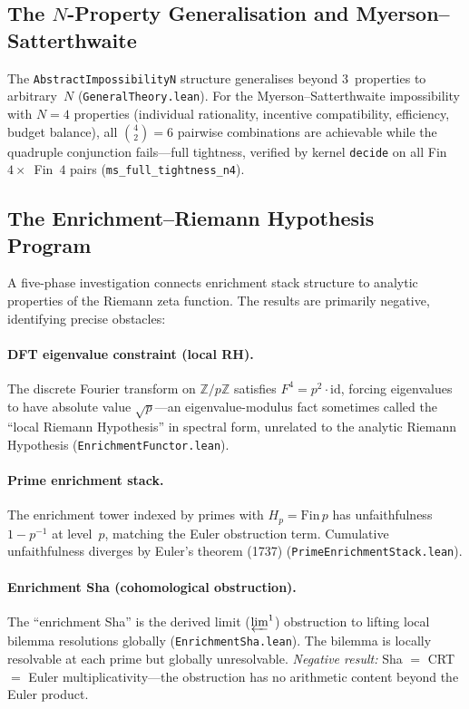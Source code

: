 \documentclass[11pt,a4paper]{article}
\begin{document}
\subsection{The $N$-Property Generalisation and Myerson--Satterthwaite}

The \texttt{AbstractImpossibilityN} structure generalises beyond 3~properties to arbitrary~$N$ (\texttt{GeneralTheory.lean}).  For the Myerson--Satterthwaite impossibility with $N = 4$ properties (individual rationality, incentive compatibility, efficiency, budget balance), all $\binom{4}{2} = 6$ pairwise combinations are achievable while the quadruple conjunction fails---full tightness, verified by kernel \texttt{decide} on all Fin~$4 \times$~Fin~$4$ pairs (\texttt{ms\_full\_tightness\_n4}).

\subsection{The Enrichment--Riemann Hypothesis Program}

A five-phase investigation connects enrichment stack structure to analytic properties of the Riemann zeta function.  The results are primarily negative, identifying precise obstacles:

\paragraph{DFT eigenvalue constraint (local RH).}
The discrete Fourier transform on $\mathbb{Z}/p\mathbb{Z}$ satisfies $F^4 = p^2 \cdot \mathrm{id}$, forcing eigenvalues to have absolute value $\sqrt{p}$---an eigenvalue-modulus fact sometimes called the ``local Riemann Hypothesis'' in spectral form, unrelated to the analytic Riemann Hypothesis (\texttt{EnrichmentFunctor.lean}).

\paragraph{Prime enrichment stack.}
The enrichment tower indexed by primes with $H_p = \mathrm{Fin}\,p$ has unfaithfulness $1 - p^{-1}$ at level~$p$, matching the Euler obstruction term.  Cumulative unfaithfulness diverges by Euler's theorem (1737) (\texttt{PrimeEnrichmentStack.lean}).

\paragraph{Enrichment Sha (cohomological obstruction).}
The ``enrichment Sha'' is the derived limit ($\varprojlim^1$) obstruction to lifting local bilemma resolutions globally (\texttt{EnrichmentSha.lean}).  The bilemma is locally resolvable at each prime but globally unresolvable.  \emph{Negative result:} Sha $=$ CRT $=$ Euler multiplicativity---the obstruction has no arithmetic content beyond the Euler product.
\end{document}
